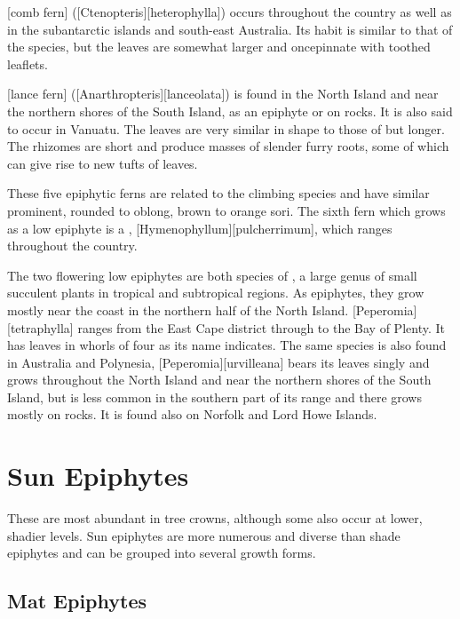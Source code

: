 [comb fern] ([Ctenopteris][heterophylla]) occurs throughout the country as well as in the subantarctic islands and south-east Australia.
Its habit is similar to that of the  species, but the leaves are somewhat larger and oncepinnate with toothed leaflets.

[lance fern] ([Anarthropteris][lanceolata]) is found in the North Island and near the northern shores of the South Island, as an epiphyte or on rocks.
It is also said to occur in Vanuatu.
The leaves are very similar in shape to those of  but longer.
The rhizomes are short and produce masses of slender furry roots, some of which can give rise to new tufts of leaves.

These five epiphytic ferns are related to the climbing  species and have similar prominent, rounded to oblong, brown to orange sori.
The sixth fern which grows as a low epiphyte is a , [Hymenophyllum][pulcherrimum], which ranges throughout the country.

The two flowering low epiphytes are both species of , a large genus of small succulent plants in tropical and subtropical regions.
As epiphytes, they grow mostly near the coast in the northern half of the North Island.
[Peperomia][tetraphylla] ranges from the East Cape district through to the Bay of Plenty.
It has leaves in whorls of four as its name indicates.
The same species is also found in Australia and Polynesia, [Peperomia][urvilleana] bears its leaves singly and grows throughout the North Island and near the northern shores of the South Island, but is less common in the southern part of its range and there grows mostly on rocks.
It is found also on Norfolk and Lord Howe Islands.

\section{Sun Epiphytes}

These are most abundant in tree crowns, although some also occur at lower, shadier levels.
Sun epiphytes are more numerous and diverse than shade epiphytes and can be grouped into several growth forms.

\subsection{Mat Epiphytes}

